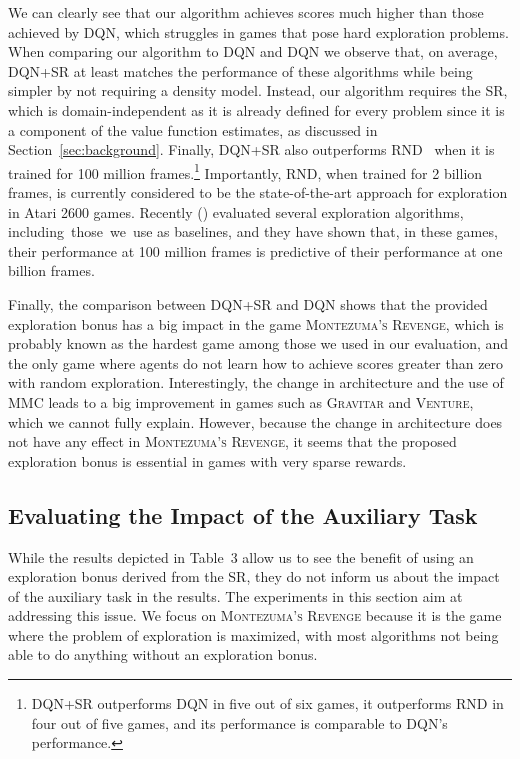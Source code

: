 \documentclass[letterpaper]{article} \usepackage{aaai20}  \usepackage{times}  \usepackage{helvet} \usepackage{courier}  \usepackage[hyphens]{url}  \usepackage{graphicx} \urlstyle{rm} \def\UrlFont{\rm}  \usepackage{graphicx}  \frenchspacing  \setlength{\pdfpagewidth}{8.5in}  \setlength{\pdfpageheight}{11in}  \usepackage{booktabs}
\begin{document}
We can clearly see that our algorithm achieves scores much higher than those achieved by DQN, which struggles in games that pose hard exploration problems.  When comparing our algorithm to \textsc{DQN} and \textsc{DQN} we observe that, on average, DQN+SR at least matches the performance of these algorithms while being simpler by not requiring a density model. Instead, our algorithm requires the SR, which is domain-independent as it is already defined for every problem since it is a component of the value function estimates, as discussed in Section~\ref{sec:background}. Finally, DQN+SR also outperforms RND~\cite{Burda19} when it is trained for 100 million frames.\footnote{DQN+SR outperforms \textsc{DQN} in five out of six games, it outperforms RND in four out of five games, and its performance is comparable to \textsc{DQN}'s performance.} Importantly, RND, when trained for 2 billion frames, is currently considered to be the state-of-the-art approach for exploration in Atari 2600 games. Recently \citeauthor{Taiga19} (\citeyear{Taiga19}) evaluated several exploration algorithms, including~those~we~use as baselines, and they have shown that, in these games, their performance at 100 million frames is predictive of their performance at one billion frames.

Finally, the comparison between DQN+SR and DQN shows that the provided exploration bonus has a big impact in the game \textsc{Montezuma's Revenge}, which is probably known as the hardest game among those we used in our evaluation, and the only game where agents do not learn how to achieve scores greater than zero with random exploration. Interestingly, the change in architecture and the use of MMC leads to a big improvement in games such as \textsc{Gravitar} and \textsc{Venture}, which we cannot fully explain. However, because the change in architecture does not have any effect in \textsc{Montezuma's Revenge}, it seems that the proposed exploration bonus is essential in games with very sparse rewards.

\subsection{Evaluating the Impact of the Auxiliary Task}

While the results depicted in Table~3 allow us to see the benefit of using an exploration bonus derived from the SR, they do not inform us about the impact of the auxiliary task in the results. The experiments in this section aim at addressing this issue. We focus on \textsc{Montezuma's Revenge} because it is the game where the problem of exploration is maximized, with most algorithms not being able to do anything without an exploration bonus.
\end{document}
